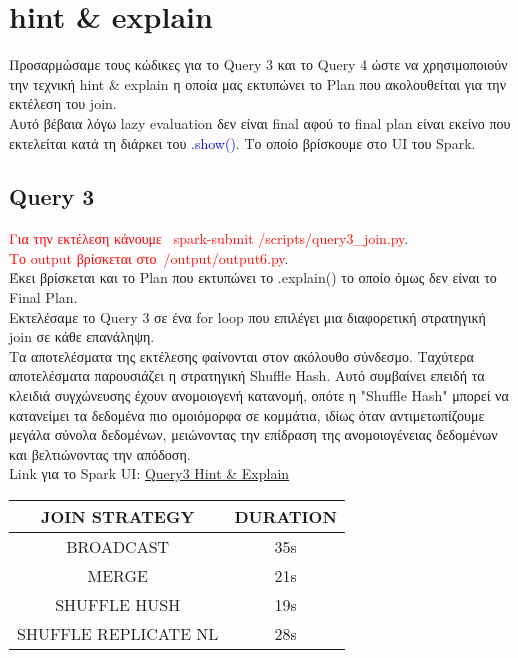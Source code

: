 \documentclass{article}
\begin{document}
\vspace{3\baselineskip}
\section{hint \& explain}
Προσαρμώσαμε τους κώδικες για το Query 3 και το Query 4 ώστε να χρησιμοποιούν την τεχνική hint \& explain η οποία μας εκτυπώνει το Plan που ακολουθείται για την εκτέλεση του join. \\
Αυτό βέβαια λόγω lazy evaluation δεν είναι final αφού το final plan είναι εκείνο που εκτελείται κατά τη διάρκει του \textcolor{blue}{.show()}. Το οποίο βρίσκουμε στο UI του Spark. \\
\subsection*{Query 3}

\textcolor{red}{Για την εκτέλεση κάνουμε  spark-submit /scripts/query3\_join.py}.  \\
\textcolor{red}{Το output βρίσκεται στο /output/output6.py}. \\
Έκει βρίσκεται και το Plan που εκτυπώνει το .explain() το οποίο όμως δεν είναι το Final Plan. \\ 
Εκτελέσαμε το Query 3 σε ένα for loop που επιλέγει μια διαφορετική στρατηγική join σε 
κάθε επανάληψη. \\

Τα αποτελέσματα της εκτέλεσης φαίνονται στον ακόλουθο σύνδεσμο. Ταχύτερα αποτελέσματα 
παρουσιάζει η στρατηγική Shuffle Hash. Αυτό συμβαίνει επειδή τα κλειδιά συγχώνευσης έχουν 
ανομοιογενή κατανομή, οπότε η "Shuffle Hash" μπορεί να κατανείμει τα δεδομένα πιο ομοιόμορφα σε κομμάτια, ιδίως όταν αντιμετωπίζουμε μεγάλα σύνολα δεδομένων, μειώνοντας την επίδραση της ανομοιογένειας δεδομένων και βελτιώνοντας την απόδοση.\\

Link για το Spark UI:
\href{http://83.212.81.191:18080/history/application_1705357398960_0018/jobs/} {Query3 Hint \& Explain}

\begin{center}
\begin{tabular}{|c|c|}
\hline
\textbf{JOIN STRATEGY} & \textbf{DURATION} \\
\hline
BROADCAST & 35s \\
\hline
MERGE & 21s \\
\hline
SHUFFLE HUSH & 19s \\
\hline
SHUFFLE REPLICATE NL & 28s \\
\hline
\end{tabular}
\end{center} 
\end{document}
